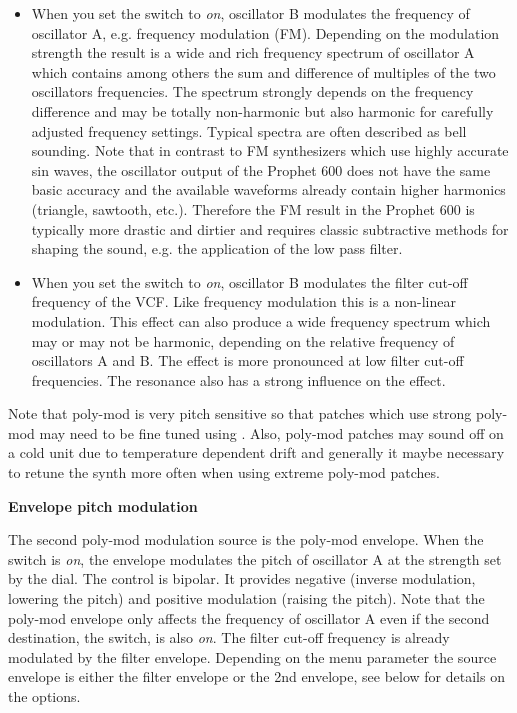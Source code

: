\begin{itemize}
  \item When you set the \polymodfreq switch to \textit{on}, oscillator B modulates the frequency of oscillator A, e.g. frequency modulation (FM). Depending on the modulation strength the result is a wide and rich frequency spectrum of oscillator A which contains among others the sum and difference of multiples of the two oscillators frequencies. The spectrum strongly depends on the frequency difference and may be totally non-harmonic but also harmonic for carefully adjusted frequency settings. Typical spectra are often described as bell sounding. Note that in contrast to FM synthesizers which use highly accurate sin waves, the oscillator output of the Prophet 600 does not have the same basic accuracy and the available waveforms already contain higher harmonics (triangle, sawtooth, etc.). Therefore the FM result in the Prophet 600 is typically more drastic and dirtier and requires classic subtractive methods for shaping the sound, e.g. the application of the low pass filter. 
  \item When you set the \polymodfilter switch to \textit{on}, oscillator B modulates the filter cut-off frequency of the VCF. Like frequency modulation this is a non-linear modulation. This effect can also produce a wide frequency spectrum which may or may not be harmonic, depending on the relative frequency of oscillators A and B. The effect is more pronounced at low filter cut-off frequencies. The resonance also has a strong influence on the effect.  
\end{itemize}

Note that poly-mod is very pitch sensitive so that patches which use strong poly-mod may need to be fine tuned using \freqfine. Also, poly-mod patches may sound off on a cold unit due to temperature dependent drift and generally it maybe necessary to retune the synth more often when using extreme poly-mod patches.

\textbf{Envelope pitch modulation}

The second poly-mod modulation source is the poly-mod envelope. When the \polymodfreq switch is \textit{on}, the envelope modulates the pitch of oscillator A at the strength set by the \polymodenv dial. The \polymodenv control is bipolar. It  provides negative (inverse modulation, lowering the pitch) and positive modulation (raising the pitch). Note that the poly-mod envelope only affects the frequency of oscillator A even if the second destination, the \polymodfilter switch, is also \textit{on}. The filter cut-off frequency is already modulated by the filter envelope. Depending on the menu parameter \envrouting the source envelope is either the filter envelope or the 2nd envelope, see below for details on the options.

